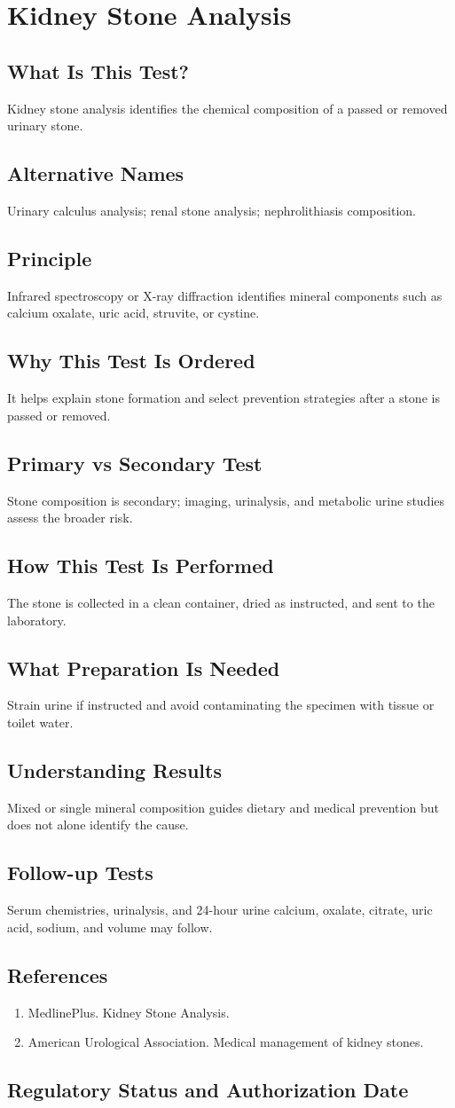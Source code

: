 \chapter{Kidney Stone Analysis}
\section*{What Is This Test?} Kidney stone analysis identifies the chemical composition of a passed or removed urinary stone.\section*{Alternative Names} Urinary calculus analysis; renal stone analysis; nephrolithiasis composition.\section*{Principle} Infrared spectroscopy or X-ray diffraction identifies mineral components such as calcium oxalate, uric acid, struvite, or cystine.\section*{Why This Test Is Ordered} It helps explain stone formation and select prevention strategies after a stone is passed or removed.\section*{Primary vs Secondary Test} Stone composition is secondary; imaging, urinalysis, and metabolic urine studies assess the broader risk.\section*{How This Test Is Performed} The stone is collected in a clean container, dried as instructed, and sent to the laboratory.\section*{What Preparation Is Needed} Strain urine if instructed and avoid contaminating the specimen with tissue or toilet water.\section*{Understanding Results} Mixed or single mineral composition guides dietary and medical prevention but does not alone identify the cause.\section*{Follow-up Tests} Serum chemistries, urinalysis, and 24-hour urine calcium, oxalate, citrate, uric acid, sodium, and volume may follow.\section*{References} \begin{enumerate}\item MedlinePlus. Kidney Stone Analysis.\item American Urological Association. Medical management of kidney stones.\end{enumerate}\clearpage\section*{Regulatory Status and Authorization Date}\clearpage

